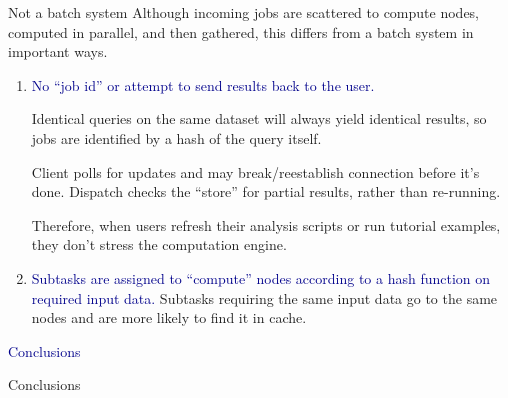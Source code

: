 \documentclass{beamer}
\begin{document}
\begin{frame}{Not a batch system}
\vspace{0.5 cm}
Although incoming jobs are scattered to compute nodes, computed in parallel, and then gathered, this differs from a batch system in important ways.

\begin{enumerate}
\item \textcolor{darkblue}{No ``job id'' or attempt to send results back to the user.}

\vspace{0.1 cm}
Identical queries on the same dataset will always yield identical results, so jobs are identified by a hash of the query itself.

\vspace{0.1 cm}
Client polls for updates and may break/reestablish connection before it's done. Dispatch checks the ``store'' for partial results, rather than re-running.

\vspace{0.1 cm}
Therefore, when users refresh their analysis scripts or run tutorial examples, they don't stress the computation engine.

\item \textcolor{darkblue}{Subtasks are assigned to ``compute'' nodes according to a hash function on required input data.} Subtasks requiring the same input data go to the same nodes and are more likely to find it in cache.
\end{enumerate}
\end{frame}

\begin{frame}{}
\begin{center}
\LARGE \textcolor{darkblue}{Conclusions}
\end{center}
\end{frame}

\begin{frame}{Conclusions}



\end{frame}
\end{document}
